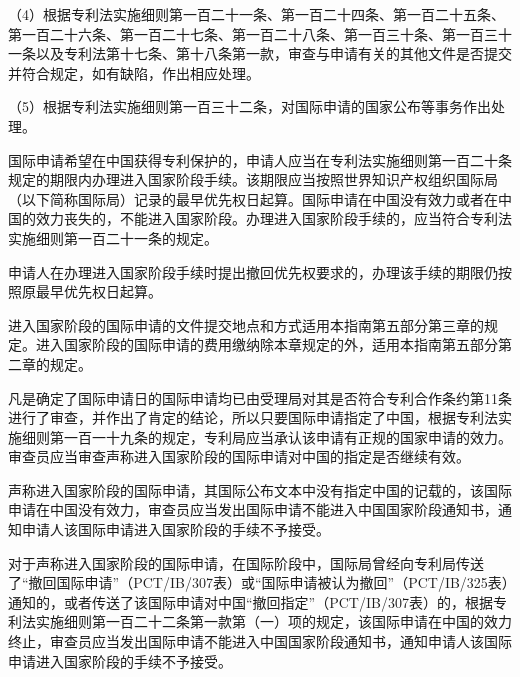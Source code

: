 {\setlength{\parindent}{17.8bp}（4）根据专利法实施细则第一百二十一条、第一百二十四条、第一百二十五条、第一百二十六条、第一百二十七条、第一百二十八条、第一百三十条、第一百三十一条以及专利法第十七条、第十八条第一款，审查与申请有关的其他文件是否提交并符合规定，如有缺陷，作出相应处理。\par}

{\setlength{\parindent}{17.8bp}（5）根据专利法实施细则第一百三十二条，对国际申请的国家公布等事务作出处理。\par}

国际申请希望在中国获得专利保护的，申请人应当在专利法实施细则第一百二十条规定的期限内办理进入国家阶段手续。该期限应当按照世界知识产权组织国际局（以下简称国际局）记录的最早优先权日起算。国际申请在中国没有效力或者在中国的效力丧失的，不能进入国家阶段。办理进入国家阶段手续的，应当符合专利法实施细则第一百二十一条的规定。

申请人在办理进入国家阶段手续时提出撤回优先权要求的，办理该手续的期限仍按照原最早优先权日起算。

进入国家阶段的国际申请的文件提交地点和方式适用本指南第五部分第三章的规定。进入国家阶段的国际申请的费用缴纳除本章规定的外，适用本指南第五部分第二章的规定。

凡是确定了国际申请日的国际申请均已由受理局对其是否符合专利合作条约第11条进行了审查，并作出了肯定的结论，所以只要国际申请指定了中国，根据专利法实施细则第一百一十九条的规定，专利局应当承认该申请有正规的国家申请的效力。审查员应当审查声称进入国家阶段的国际申请对中国的指定是否继续有效。

声称进入国家阶段的国际申请，其国际公布文本中没有指定中国的记载的，该国际申请在中国没有效力，审查员应当发出国际申请不能进入中国国家阶段通知书，通知申请人该国际申请进入国家阶段的手续不予接受。

{\setlength{\parindent}{0.0bp}对于声称进入国家阶段的国际申请，在国际阶段中，国际局曾经向专利局传送了“撤回国际申请”（PCT/IB/307表）或“国际申请被认为撤回”（PCT/IB/325表）通知的，或者传送了该国际申请对中国“撤回指定”（PCT/IB/307表）的，根据专利法实施细则第一百二十二条第一款第（一）项的规定，该国际申请在中国的效力终止，审查员应当发出国际申请不能进入中国国家阶段通知书，通知申请人该国际申请进入国家阶段的手续不予接受。\par}

